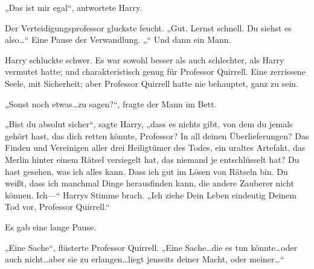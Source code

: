 „Das ist mir egal“, antwortete Harry.

Der Verteidigungsprofessor gluckste feucht.
„Gut. Lernst schnell. Du siehst es also…“
Eine Pause der Verwandlung.
„“
Und dann ein Mann.

Harry schluckte schwer. Es war sowohl besser als auch schlechter, als Harry vermutet hatte; und charakteristisch genug für Professor Quirrell.
Eine zerrissene Seele, mit Sicherheit; aber Professor Quirrell hatte nie behauptet, ganz zu sein.

„Sonst noch etwas…zu sagen?“, fragte der Mann im Bett.

„Bist du absolut sicher“, sagte Harry, „dass es nichts gibt, von dem du jemals gehört hast, das dich retten könnte, Professor? In all deinen Überlieferungen? Das Finden und Vereinigen aller drei Heiligtümer des Todes, ein uraltes Artefakt, das Merlin hinter einem Rätsel versiegelt hat, das niemand je entschlüsselt hat? Du hast gesehen, was ich alles kann. Dass ich gut im Lösen von Rätseln bin. Du weißt, dass ich manchmal Dinge herausfinden kann, die andere Zauberer nicht können. Ich—“
Harrys Stimme brach.
„Ich ziehe Dein Leben eindeutig Deinem Tod vor, Professor Quirrell.“

Es gab eine lange Pause.

„Eine Sache“, flüsterte Professor Quirrell. „Eine Sache…die es tun könnte…oder auch nicht…aber sie zu erlangen…liegt jenseits deiner Macht, oder meiner…“

